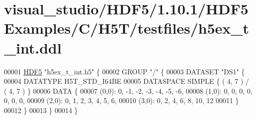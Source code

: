 \hypertarget{visual__studio_2_h_d_f5_21_810_81_2_h_d_f5_examples_2_c_2_h5_t_2testfiles_2h5ex__t__int_8ddl_source}{}\section{visual\+\_\+studio/\+H\+D\+F5/1.10.1/\+H\+D\+F5\+Examples/\+C/\+H5\+T/testfiles/h5ex\+\_\+t\+\_\+int.ddl}
\label{visual__studio_2_h_d_f5_21_810_81_2_h_d_f5_examples_2_c_2_h5_t_2testfiles_2h5ex__t__int_8ddl_source}

\begin{DoxyCode}
00001 \hyperlink{namespace_h_d_f5}{HDF5} \textcolor{stringliteral}{"h5ex\_t\_int.h5"} \{
00002 GROUP \textcolor{stringliteral}{"/"} \{
00003    DATASET \textcolor{stringliteral}{"DS1"} \{
00004       DATATYPE  H5T\_STD\_I64BE
00005       DATASPACE  SIMPLE \{ ( 4, 7 ) / ( 4, 7 ) \}
00006       DATA \{
00007       (0,0): 0, -1, -2, -3, -4, -5, -6,
00008       (1,0): 0, 0, 0, 0, 0, 0, 0,
00009       (2,0): 0, 1, 2, 3, 4, 5, 6,
00010       (3,0): 0, 2, 4, 6, 8, 10, 12
00011       \}
00012    \}
00013 \}
00014 \}
\end{DoxyCode}
